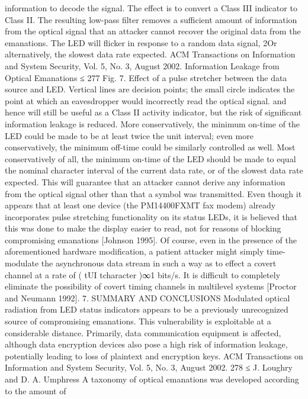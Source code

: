 information to decode the signal. The effect is to convert a Class III indicator to 
Class II. The resulting low-pass filter removes a sufficient amount of information 
from the optical signal that an attacker cannot recover the original data 
from the emanations. The LED will flicker in response to a random data signal, 
2Or alternatively, the slowest data rate expected. 
ACM Transactions on Information and System Security, Vol. 5, No. 3, August 2002.
Information Leakage from Optical Emanations ≤ 277 
Fig. 7. Effect of a pulse stretcher between the data source and LED. Vertical lines are decision 
points; the small circle indicates the point at which an eavesdropper would incorrectly read the 
optical signal. 
and hence will still be useful as a Class II activity indicator, but the risk of 
significant information leakage is reduced. 
More conservatively, the minimum on-time of the LED could be made to be at 
least twice the unit interval; even more conservatively, the minimum off-time 
could be similarly controlled as well. Most conservatively of all, the minimum 
on-time of the LED should be made to equal the nominal character interval of 
the current data rate, or of the slowest data rate expected. This will guarantee 
that an attacker cannot derive any information from the optical signal other 
than that a symbol was transmitted. 
Even though it appears that at least one device (the PM14400FXMT fax 
modem) already incorporates pulse stretching functionality on its status LEDs, 
it is believed that this was done to make the display easier to read, not for 
reasons of blocking compromising emanations [Johnson 1995]. 
Of course, even in the presence of the aforementioned hardware modification, 
a patient attacker might simply time-modulate the asynchronous data stream 
in such a way as to effect a covert channel at a rate of ( tUI 
tcharacter 
)∞1 bits/s. It is 
difficult to completely eliminate the possibility of covert timing channels in 
multilevel systems [Proctor and Neumann 1992]. 
7. SUMMARY AND CONCLUSIONS 
Modulated optical radiation from LED status indicators appears to be a previously 
unrecognized source of compromising emanations. This vulnerability is 
exploitable at a considerable distance. Primarily, data communication equipment 
is affected, although data encryption devices also pose a high risk of 
information leakage, potentially leading to loss of plaintext and encryption 
keys. 
ACM Transactions on Information and System Security, Vol. 5, No. 3, August 2002.
278 ≤ J. Loughry and D. A. Umphress 
A taxonomy of optical emanations was developed according to the amount of 
